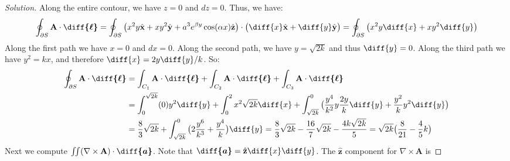 \documentclass[crop=false,class=article,oneside]{standalone}
\begin{document}
        \begin{proof}[Solution]
            Along the entire contour, we have $z=0$ and $dz=0$.
            Thus, we have:
            \begin{equation*}
                \oint_{\partial S}
                \mathbf{A}\cdot\boldsymbol{\diff{\ell}}
                =\oint_{\partial S}
                \big(
                     x^{2}y\hat{\mathbf{x}}
                    +xy^{2}\hat{\mathbf{y}}
                    +a^{3}e^{\beta{y}}\cos(\alpha{x})\hat{\mathbf{z}}
                \big)
                \cdot\big(
                     \diff{x}\hat{\mathbf{x}}
                    +\diff{y}\hat{\mathbf{y}}
                \big)
                =\oint_{\partial S}
                \big(x^{2}y\diff{x}+xy^{2}\diff{y}\big)
            \end{equation*}
            Along the first path we have $x=0$ and $dx=0$.
            Along the second path, we
            have $y=\sqrt{2k}$ and thus $\diff{y}=0$.
            Along the third path we have $y^{2}=kx$,
            and therefore $\diff{x}=2y\diff{y}/k$. So:
            \begin{align*}
                \oint_{\partial S}
                \mathbf{A}\cdot\boldsymbol{\diff{\ell}}
                &=\int_{C_{1}}\mathbf{A}
                \cdot\boldsymbol{\diff{\ell}}
                +\int_{C_{2}}\mathbf{A}
                \cdot\boldsymbol{\diff{\ell}}
                +\int_{C_{3}}
                \mathbf{A}\cdot\boldsymbol{\diff{\ell}}\\
                &=\int_{0}^{\sqrt{2k}}(0)y^{2}\diff{y}
                 +\int_{0}^{2}x^{2}\sqrt{2k}\diff{x}
                 +\int_{\sqrt{2k}}^{0}\big(
                    \frac{y^{4}}{k^2}y\frac{2y}{k}\diff{y}
                    +\frac{y^{2}}{k}y^{2}\diff{y}
                \big)\\
                &=\frac{8}{3}\sqrt{2k}
                 +\int_{\sqrt{2k}}^{0}\big(2\frac{y^{6}}{k^{3}}
                 +\frac{y^{4}}{k}\big)\diff{y}
                =\frac{8}{3}\sqrt{2k}
                -\frac{16}{7}\sqrt{2k}
                -\frac{4k\sqrt{2k}}{5}
                =\sqrt{2k}\big(\frac{8}{21}-\frac{4}{5}k\big)
            \end{align*}
            Next we compute
            $\iint(\nabla\times\mathbf{A})%
             \cdot\boldsymbol{\diff{a}}$.
            Note that
            $\boldsymbol{\diff{a}}%
             =\hat{\mathbf{z}}\diff{x}\diff{y}$.
            The $\hat{\mathbf{z}}$
            component for $\nabla\times\mathbf{A}$ is

\end{proof}
\end{document}
